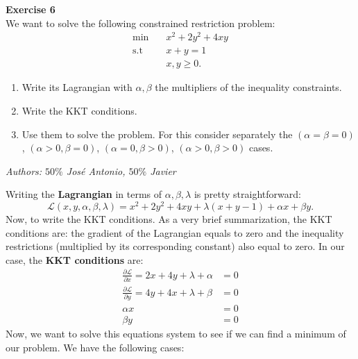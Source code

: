 \documentclass[11pt,table]{article}
\newenvironment{problem}[2][Exercise]
{ \begin{mdframed}[backgroundcolor=gray!20] \textbf{#1 #2} \\}
	{\hspace{0.0cm}\newline\newline \emph{Authors: \(50\%\) José Antonio, \(50\%\) Javier}  \end{mdframed}}
\begin{document}
\begin{problem}{6}
We want to solve the following constrained restriction problem:
\begin{align*}
	\min \quad       & x^{2} + 2y^{2} + 4xy \\
	\text{s.t} \quad & x + y = 1            \\
	                 & x,y \geq 0.
\end{align*}
\begin{enumerate}
	\item Write its Lagrangian with \(\alpha,\beta\) the multipliers of the inequality constraints.
	\item Write the KKT conditions.
	\item Use them to solve the problem. For this consider separately the \((\alpha = \beta = 0)\), \((\alpha > 0, \beta = 0)\), \((\alpha = 0, \beta > 0)\), \((\alpha > 0, \beta > 0)\) cases.
\end{enumerate}
\end{problem}

Writing the \textbf{Lagrangian} in terms of \(\alpha,\beta,\lambda\) is pretty straightforward:
\[
	\mathcal L(x,y,\alpha,\beta,\lambda) = x^{2} + 2y^{2} + 4xy + \lambda(x+y - 1) + \alpha x + \beta y .
\]
Now, to write the KKT conditions. As a very brief summarization, the KKT conditions are: the gradient of the Lagrangian equals to zero and the inequality restrictions (multiplied by its corresponding constant) also equal to zero. In our case, the \textbf{KKT conditions} are:
\begin{align*}
	\frac{\partial \mathcal L}{\partial x}  = 2x + 4y + \lambda + \alpha & = 0 \\
	\frac{\partial \mathcal L}{\partial y}  = 4y + 4x + \lambda + \beta  & = 0 \\
	\alpha x                                                             & = 0 \\
	\beta y                                                              & = 0
\end{align*}
Now, we want to solve this equations system to see if we can find a minimum of our problem. We have the following cases:
\end{document}

